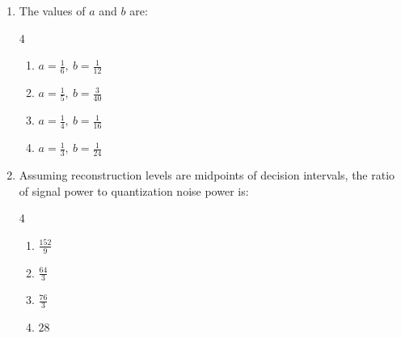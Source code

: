 \begin{enumerate}[label=\thesubsection.\arabic*,ref=\thesubsection.\theenumi]
\begin{enumerate}
\item The values of $a$ and $b$ are:
\begin{multicols}{4}
\begin{enumerate}
  \item $a=\tfrac{1}{6},\ b=\tfrac{1}{12}$
  \item $a=\tfrac{1}{5},\ b=\tfrac{3}{40}$
  \item $a=\tfrac{1}{4},\ b=\tfrac{1}{16}$
  \item $a=\tfrac{1}{3},\ b=\tfrac{1}{24}$
\end{enumerate}
\end{multicols}

\item Assuming reconstruction levels are midpoints of decision intervals, the ratio of signal power to quantization noise power is:

\begin{multicols}{4}
\begin{enumerate}
  \item $\frac{152}{9}$
  \item $\frac{64}{3}$
  \item $\frac{76}{3}$
  \item $28$
\end{enumerate}
\end{multicols}
\end{enumerate}


\end{enumerate}
